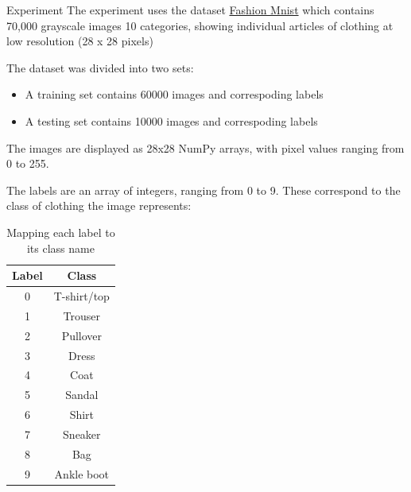 \documentclass[10pt]{beamer}
\theoremstyle{remark}
\theoremstyle{definition}
\begin{document}
\begin{frame}[allowframebreaks]{Experiment}
	The experiment uses the dataset \href{https://github.com/zalandoresearch/fashion-mnist}{Fashion Mnist} which contains 70,000 grayscale images 10 categories, showing individual articles of clothing at low resolution (28 x 28 pixels)

	The dataset was divided into two sets:
	\begin{itemize}
		\item A training set contains 60000 images and correspoding labels
  		\item A testing set contains 10000 images and correspoding labels
	\end{itemize}

	The images are displayed as 28x28 NumPy arrays, with pixel values ranging from 0 to 255. 
	
	The labels are an array of integers, ranging from 0 to 9. These correspond to the class of clothing the image represents:

	\begin{table} [h!]
		\centering
		\begin{tabular}{ || c | c  || }
		\hline
		Label & Class \\ [0.5 ex]
		\hline \hline
		0 & T-shirt/top \\ \hline
		1 & Trouser \\ \hline
		2 & Pullover \\ \hline
		3 & Dress \\ \hline
		4 & Coat \\ \hline
		5 & Sandal\\ \hline
		6 & Shirt\\ \hline 
		7 & Sneaker \\ \hline
		8 & Bag \\ \hline
		9 & Ankle boot \\ [1ex]
		\hline
		\end{tabular}
		\caption{Mapping each label to its class name}
	\end{table}


\end{frame}
\end{document}
